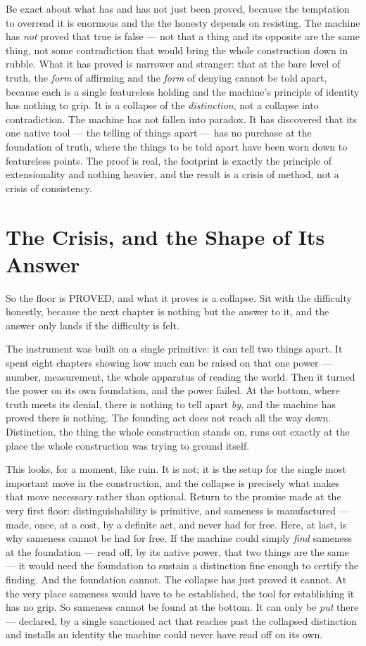 Be exact about what has and has not just been proved, because the temptation to overread it is enormous and the
the honesty depends on resisting. The machine has \emph{not} proved that true is false --- not that a thing and
its opposite are the same thing, not some contradiction that would bring the whole construction down in rubble.
What it has proved is narrower and stranger: that at the bare level of truth, the \emph{form} of affirming and the
\emph{form} of denying cannot be told apart, because each is a single featureless holding and the machine's
principle of identity has nothing to grip. It is a collapse of the \emph{distinction}, not a collapse into
contradiction. The machine has not fallen into paradox. It has discovered that its one native tool --- the telling
of things apart --- has no purchase at the foundation of truth, where the things to be told apart have been worn
down to featureless points. The proof is real, the footprint is exactly the principle of extensionality and
nothing heavier, and the result is a crisis of method, not a crisis of consistency.

\section{The Crisis, and the Shape of Its Answer}

So the floor is PROVED, and what it proves is a collapse. Sit with the difficulty honestly, because the next
chapter is nothing but the answer to it, and the answer only lands if the difficulty is felt.

The instrument was built on a single primitive: it can tell two things apart. It spent eight chapters showing how
much can be raised on that one power --- number, measurement, the whole apparatus of reading the world. Then it
turned the power on its own foundation, and the power failed. At the bottom, where truth meets its denial, there
is nothing to tell apart \emph{by}, and the machine has proved there is nothing. The founding act does not reach
all the way down. Distinction, the thing the whole construction stands on, runs out exactly at the place the whole
construction was trying to ground itself.

This looks, for a moment, like ruin. It is not; it is the setup for the single most important move in the
construction, and the collapse is precisely what makes that move necessary rather than optional. Return to the
promise made at the very first floor: distinguishability is primitive, and sameness is manufactured --- made,
once, at a cost, by a definite act, and never had for free. Here, at last, is why sameness cannot be had for free.
If the machine could simply \emph{find} sameness at the foundation --- read off, by its native power, that two
things are the same --- it would need the foundation to sustain a distinction fine enough to certify the finding.
And the foundation cannot. The collapse has just proved it cannot. At the very place sameness would have to be
established, the tool for establishing it has no grip. So sameness cannot be found at the bottom. It can only be
\emph{put} there --- declared, by a single sanctioned act that reaches past the collapsed distinction and installs
an identity the machine could never have read off on its own.

